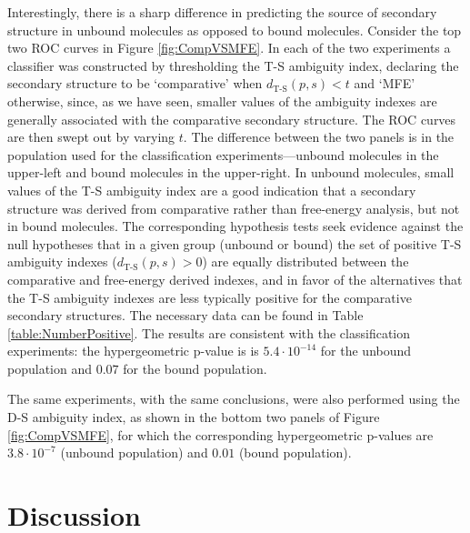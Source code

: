 \documentclass[10pt,letterpaper]{article}
\begin{document}
Interestingly, there is a sharp difference in predicting the source of secondary structure in unbound molecules as opposed to bound molecules. Consider the top two ROC curves in Figure
\ref{fig:CompVSMFE}. In each of the two experiments a classifier was constructed by thresholding the T-S ambiguity index, declaring the secondary structure to be 
`comparative' when $d_\text{T-S}(p,s)<t$ and `MFE' otherwise, since, as we have seen, smaller values of the ambiguity indexes are generally associated with the comparative secondary structure. The ROC curves are then swept out by varying $t$. The difference between the two panels is in the population used for the classification experiments---unbound molecules in the upper-left and bound molecules in the upper-right. In unbound molecules, small values of the T-S ambiguity index are a good indication that a secondary structure was derived from comparative rather than free-energy analysis, but not in bound molecules. The corresponding hypothesis tests seek evidence against the null hypotheses that in a given group (unbound or bound) the set of positive T-S ambiguity indexes ($d_\text{T-S}(p,s)>0$) are equally distributed between the comparative and free-energy derived indexes, and in favor of the alternatives that the T-S ambiguity indexes are less typically positive for the comparative secondary structures. The necessary data can be found in Table \ref{table:NumberPositive}. The results are consistent with the classification experiments: the hypergeometric p-value is 
is $5.4\cdot 10^{-14}$ for the unbound population and $0.07$ for the bound population.

The same experiments, with the same conclusions, were also performed using the D-S ambiguity index, as shown in the bottom two panels of Figure \ref{fig:CompVSMFE}, for which the corresponding hypergeometric p-values are $3.8\cdot 10^{-7}$ (unbound population) and $0.01$ (bound population). 




\section*{Discussion}
\end{document}
